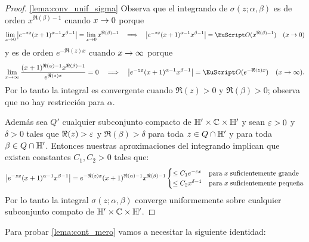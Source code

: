 \documentclass[../../tesis_maestria]{subfiles}
\begin{document}
\begin{proof}\ref{lema:conv_unif_sigma}
  Observa que el integrando de $\sigma(z;\alpha,\beta)$ es de orden $x^{\Re(\beta)-1}$ cuando
$x\rightarrow0$ porque 
\[
  \lim_{x\ra0}\abs{e^{-zx}(x+1)^{\alpha-1}x^{\beta-1}}=\lim_{x\ra0}x^{\Re(\beta)-1}\quad\then\quad
  \abs{e^{-zx}(x+1)^{\alpha-1}x^{\beta-1}}=\Oo(x^{\Re(\beta)-1})\quad(x\ra0)
\]
y es de orden $e^{-\Re(z)x}$ cuando $x\rightarrow\infty$ porque
\[
  \lim_{x\rai}\frac{(x+1)^{\Re(\alpha)-1}x^{\Re(\beta)-1}}{e^{\Re(z)x}}=0 \quad\then\quad
  \abs{e^{-zx}(x+1)^{\alpha-1}x^{\beta-1}}=\Oo(e^{-\Re(z)x})\quad(x\rai).
\]
Por lo tanto la integral es convergente cuando $\Re(z)>0$ y $\Re(\beta)>0$; observa que no hay
restricci\'on para $\alpha$.

Adem\'as sea $Q'$ cualquier subconjunto compacto de $\mathbb{H}'\times\mathbb{C}\times\mathbb{H}'$ y sean $\varepsilon>0$ y
$\delta>0$ tales que $\Re(z)>\varepsilon$ y $\Re(\beta)>\delta$ para toda $z\in Q\cap\mathbb{H}'$ y para toda
$\beta\in Q\cap\mathbb{H}'$. Entonces nuestras aproximaciones del integrando implican que existen
constantes $C_1,C_2>0$ tales que:
\[
  \left| e^{-zx}(x+1)^{\alpha-1}x^{\beta-1} \right|=e^{-\Re(z)x}(x+1)^{\Re(\alpha)-1}x^{\Re(\beta)-1}
  \begin{cases}
    \leq C_1e^{-\varepsilon x} &\text{para}\;x\;\text{suficientemente grande}\\
    \leq C_2x^{\delta-1} &\text{para}\;x\;\text{suficientemente peque\~na}
  \end{cases}
\]
Por lo tanto la integral $\sigma(z;\alpha,\beta)$ converge uniformemente sobre cualquier
subconjunto compato de $\mathbb{H}'\times\mathbb{C}\times\mathbb{H}'$.
\end{proof}

Para probar \ref{lema:cont_mero} vamos a necesitar la siguiente identidad:
\end{document}
